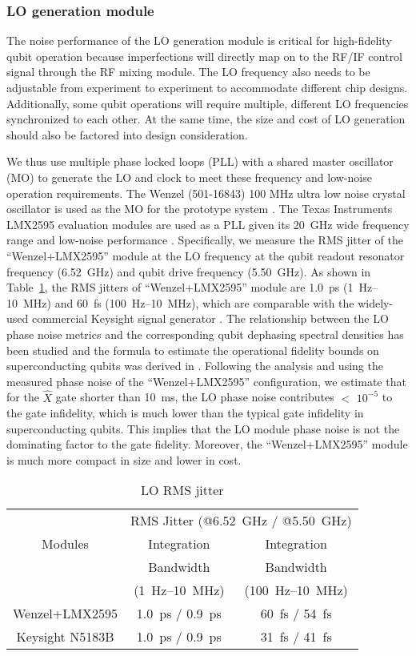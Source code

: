 \documentclass{ieeetran}
\begin{document}
\subsubsection{LO generation module}
The noise performance of the LO generation module is critical for high-fidelity qubit operation because imperfections will directly map on to the RF/IF control signal through the RF mixing module. 
The LO frequency also needs to be adjustable from experiment to experiment to accommodate different chip designs. 
Additionally, some qubit operations will require multiple, different LO frequencies synchronized to each other.
At the same time, the size and cost of LO generation should also be factored into design consideration.

We thus use multiple phase locked loops (PLL) with a shared master oscillator (MO) to generate the LO and clock to meet these frequency and low-noise operation requirements.
The Wenzel (501-16843) 100 MHz ultra low noise crystal oscillator is used as the MO for the prototype system \cite{wenzel2006uln}.
The Texas Instruments LMX2595 evaluation modules are used as a PLL given its 20~GHz wide frequency range and low-noise performance \cite{ti2017lmx2595}.
Specifically, we measure the RMS jitter of the ``Wenzel+LMX2595'' module at the LO frequency at the qubit readout resonator frequency (6.52~GHz) and qubit drive frequency (5.50~GHz). 
As shown in Table~\ref{tab:LO}, the RMS jitters of ``Wenzel+LMX2595'' module are 1.0~ps (1~Hz--10~MHz) and 60~fs (100~Hz--10~MHz), which are comparable with the widely-used commercial Keysight signal generator \cite{keysight2021n5183b}.
The relationship between the LO phase noise metrics and the corresponding qubit dephasing spectral densities has been studied and the formula to estimate the operational fidelity bounds on superconducting qubits was derived in \cite{ball2016role}. 
Following the analysis and using the measured phase noise of the ``Wenzel+LMX2595'' configuration, we estimate that for the $\hat{X}$ gate shorter than 10~ms, the LO phase noise contributes $<$ $10^{-5}$ to the gate infidelity, which is much lower than the typical gate infidelity in superconducting qubits. 
This implies that the LO module phase noise is not the dominating factor to the gate fidelity.
Moreover, the ``Wenzel+LMX2595'' module is much more compact in size and lower in cost.

\begin{table}
\centering
\caption{LO RMS jitter}
\label{table}
\setlength{\tabcolsep}{3pt}
\begin{tabular}{c|c|c}
\hline
\multirow{3}{*}{Modules}&\multicolumn{2}{c}{RMS Jitter (@6.52~GHz / @5.50~GHz)}\\
\cline{2-3}
& Integration & Integration \\
& Bandwidth & Bandwidth \\
& (1~Hz--10~MHz) & (100~Hz--10~MHz) \\
\hline
Wenzel+LMX2595 & 1.0~ps / 0.9~ps & 60~fs / 54~fs \\
\hline
Keysight N5183B & 1.0~ps / 0.9~ps & 31~fs / 41~fs \\ 
\hline
\end{tabular}
\label{tab:LO}
\end{table}
\end{document}
